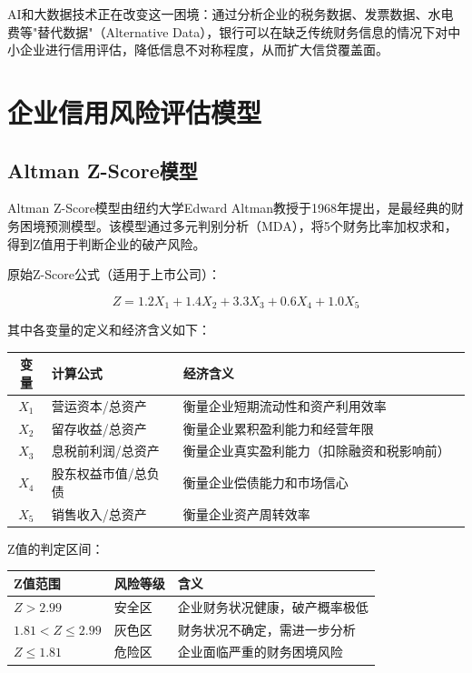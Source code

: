 AI和大数据技术正在改变这一困境：通过分析企业的税务数据、发票数据、水电费等"替代数据"（Alternative Data），银行可以在缺乏传统财务信息的情况下对中小企业进行信用评估，降低信息不对称程度，从而扩大信贷覆盖面。

\section{企业信用风险评估模型}

\subsection{Altman Z-Score模型}

Altman Z-Score模型由纽约大学Edward Altman教授于1968年提出，是最经典的财务困境预测模型。该模型通过多元判别分析（MDA），将5个财务比率加权求和，得到Z值用于判断企业的破产风险。

原始Z-Score公式（适用于上市公司）：

\[
Z = 1.2 X_1 + 1.4 X_2 + 3.3 X_3 + 0.6 X_4 + 1.0 X_5
\]

其中各变量的定义和经济含义如下：

\begin{table}[H]
\centering
\begin{tabular}{cllp{5cm}}
\toprule
\textbf{变量} & \textbf{计算公式} & \textbf{经济含义} \\
\midrule
$X_1$ & 营运资本/总资产 & 衡量企业短期流动性和资产利用效率 \\
$X_2$ & 留存收益/总资产 & 衡量企业累积盈利能力和经营年限 \\
$X_3$ & 息税前利润/总资产 & 衡量企业真实盈利能力（扣除融资和税影响前） \\
$X_4$ & 股东权益市值/总负债 & 衡量企业偿债能力和市场信心 \\
$X_5$ & 销售收入/总资产 & 衡量企业资产周转效率 \\
\bottomrule
\end{tabular}
\end{table}

Z值的判定区间：

\begin{table}[H]
\centering
\begin{tabular}{llp{6cm}}
\toprule
\textbf{Z值范围} & \textbf{风险等级} & \textbf{含义} \\
\midrule
$Z > 2.99$ & 安全区 & 企业财务状况健康，破产概率极低 \\
$1.81 < Z \leq 2.99$ & 灰色区 & 财务状况不确定，需进一步分析 \\
$Z \leq 1.81$ & 危险区 & 企业面临严重的财务困境风险 \\
\bottomrule
\end{tabular}
\end{table}

